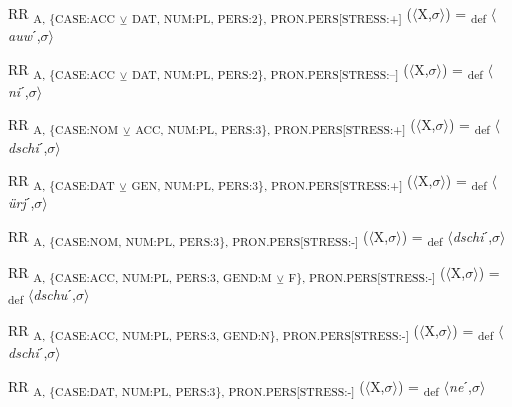 {\begin{exe}
 RR \textsubscript{A, \{CASE:ACC} \textsubscript{${\veebar}$}\textsubscript{ DAT, NUM:PL, PERS:2\}, PRON.PERS[STRESS:+]} ($\langle$X,$\sigma $$\rangle$) = \textsubscript{def} $\langle$\textit{auw}ˊ,$\sigma $$\rangle$
\end{exe}

\begin{exe}
 RR \textsubscript{A, \{CASE:ACC} \textsubscript{${\veebar}$}\textsubscript{ DAT, NUM:PL, PERS:2\}, PRON.PERS[STRESS:–]} ($\langle$X,$\sigma $$\rangle$) = \textsubscript{def} $\langle$\textit{ni}ˊ,$\sigma $$\rangle$
\end{exe}

\begin{exe}
 RR \textsubscript{A, \{CASE:NOM} \textsubscript{${\veebar}$}\textsubscript{ ACC, NUM:PL, PERS:3\}, PRON.PERS[STRESS:+]} ($\langle$X,$\sigma $$\rangle$) = \textsubscript{def} $\langle$\textit{dschi}ˊ,$\sigma $$\rangle$
\end{exe}

\begin{exe}
 RR \textsubscript{A, \{CASE:DAT} \textsubscript{${\veebar}$}\textsubscript{ GEN, NUM:PL, PERS:3\}, PRON.PERS[STRESS:+]} ($\langle$X,$\sigma $$\rangle$) = \textsubscript{def} $\langle$\textit{ürj}ˊ,$\sigma $$\rangle$
\end{exe}

\begin{exe}
 RR \textsubscript{A, \{CASE:NOM, NUM:PL, PERS:3\}, PRON.PERS[STRESS:-]} ($\langle$X,$\sigma $$\rangle$) = \textsubscript{def} $\langle$\textit{dschi}ˊ,$\sigma $$\rangle$
\end{exe}

\begin{exe}
 RR \textsubscript{A, \{CASE:ACC, NUM:PL, PERS:3, GEND:M} \textsubscript{${\veebar}$}\textsubscript{ F\}, PRON.PERS[STRESS:-]} ($\langle$X,$\sigma $$\rangle$) = \textsubscript{def} $\langle$\textit{dschu}ˊ,$\sigma $$\rangle$
\end{exe}

\begin{exe}
 RR \textsubscript{A, \{CASE:ACC, NUM:PL, PERS:3, GEND:N\}, PRON.PERS[STRESS:-]} ($\langle$X,$\sigma $$\rangle$) = \textsubscript{def} $\langle$\textit{dschi}ˊ,$\sigma $$\rangle$
\end{exe}

\begin{exe}
 RR \textsubscript{A, \{CASE:DAT, NUM:PL, PERS:3\}, PRON.PERS[STRESS:-]} ($\langle$X,$\sigma $$\rangle$) = \textsubscript{def} $\langle$\textit{ne}ˊ,$\sigma $$\rangle$
\end{exe}

}
